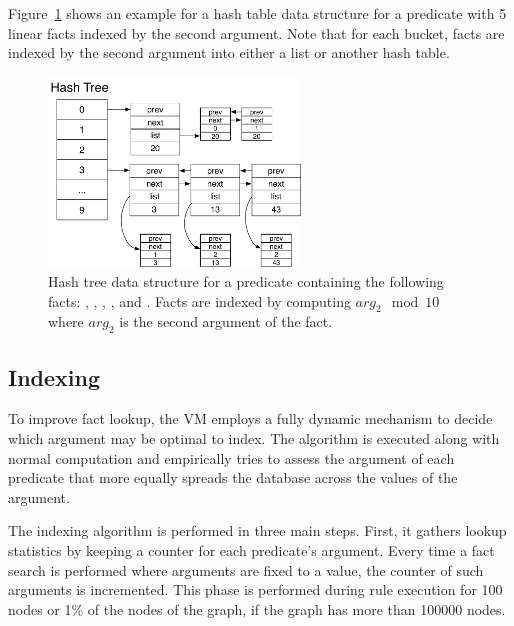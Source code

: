 Figure~\ref{fig:implementation:hash_table} shows an example for a hash table
data structure for a  predicate with 5 linear facts indexed by
the second argument. Note that for each bucket, facts are indexed by the second
argument into either a list or another hash table.

\begin{figure}[ht]
   \centering
   \includegraphics[width=0.6\textwidth]{figures/implementation/hash_table.pdf}

   \caption{Hash tree data structure for a  predicate
   containing the following facts: , , , , and . Facts are indexed by computing
   $arg_2\mod{}10$ where $arg_2$ is the second argument of the fact.}

   \label{fig:implementation:hash_table}
\end{figure}


\subsection{Indexing}\label{sec:implementation:indexing}

To improve fact lookup, the VM employs a fully dynamic mechanism to
decide which argument may be optimal to index.  The algorithm is
executed along with normal computation and empirically tries to
assess the argument of each predicate that more equally spreads the
database across the values of the argument. 

The indexing algorithm is performed in three main steps. First, it gathers
lookup statistics by keeping a counter for each predicate's argument. Every time
a fact search is performed where arguments are fixed to a value, the counter of
such arguments is incremented. This phase is performed during rule execution for
100 nodes or 1\% of the nodes of the graph, if the graph has more than 100000
nodes.

